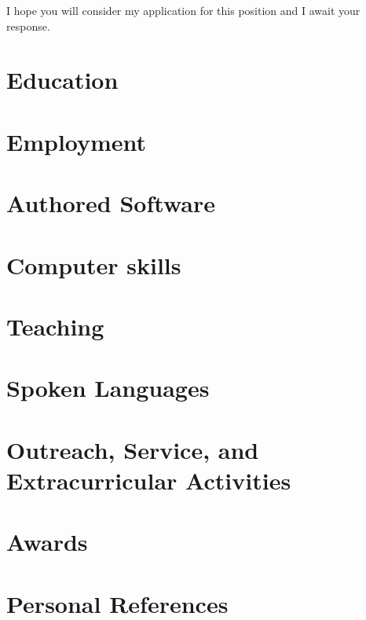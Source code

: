 \documentclass[11pt,letterpaper,sans]{moderncv} %
\begin{document}
I hope you will consider my application for this position and I await your
response.


\makeletterclosing %

\clearpage

\makecvtitle %
\section{Education}


\section{Employment}


\section{Authored Software}


\section{Computer skills}


\section{Teaching}


\section{Spoken Languages}


\section{Outreach, Service, and Extracurricular Activities}


\section{Awards}




\newpage 

\section{Personal References}
\end{document}
